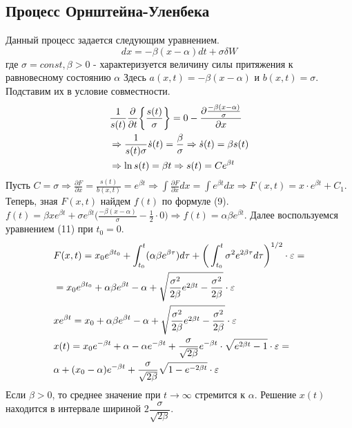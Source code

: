 \documentclass[12pt]{article}
\theoremstyle{definition}
\begin{document}
\subsection{Процесс Орнштейна-Уленбека}
Данный процесс задается следующим уравнением.
\begin{equation}
dx=-\beta(x-\alpha) dt +\sigma\delta W
\end{equation}
где $\sigma=const,\beta>0$ - характеризуется величину силы притяжения к равновесному состоянию $\alpha$
Здесь $a(x,t)=-\beta(x-\alpha)$ и $b(x,t)=\sigma$. Подставим их в условие совместности.
\begin{align}
  &\frac{1}{s(t)}\frac{\partial}{\partial t}\bigg\{ \frac{s(t)}{\sigma} \bigg\}=\notag
  0-\frac{\partial \frac{-\beta(x-\alpha)}{\sigma}}{\partial x}\\
  &\Rightarrow \frac{1}{s(t)\sigma}\dot{s}(t)=\frac{\beta}{\sigma} \Rightarrow \dot{s}(t)=\beta s(t)\\
  &\Rightarrow \ln{s(t)}=\beta t\Rightarrow s(t)=C e^{\beta t}\notag
\end{align}
Пусть $\displaystyle C=\sigma\Rightarrow \frac{\partial F}{\partial x}=\frac{s(t)}{b(x,t)}=e^{\beta t}\Rightarrow
\int \frac{\partial F}{\partial x}dx=\int e^{\beta t} dx\Rightarrow F(x,t)=x\cdot e^{\beta t}+C_1$.
Теперь, зная $F(x,t)$ найдем $f(t)$ по формуле (9).
$\displaystyle f(t)=\beta x e^{\beta t}+\sigma e^{\beta t}\bigg(\frac{-\beta(x-\alpha)}{\sigma}-\frac{1}{2}\cdot 0\bigg)\Rightarrow
 f(t)=\alpha\beta e^{\beta t}$.
 Далее воспользуемся уравнением (11) при $t_0=0$.
 \begin{align}
   &F(x,t)=x_0e^{\beta t_0}+\int_{t_0}^t (\alpha\beta e^{\beta \tau})d\tau+\bigg(\int_{t_0}^t \sigma^2e^{2\beta \tau}d\tau\bigg)^{1/2}\cdot\varepsilon=\notag\\
   &=x_0e^{\beta t_0}+\alpha\beta e^{\beta t}-\alpha+\sqrt{\frac{\sigma^2}{2\beta}e^{2\beta t}-\frac{\sigma^2}{2\beta}}\cdot\varepsilon\notag\\
   & xe^{\beta t}=x_0+\alpha\beta e^{\beta t}-\alpha+\sqrt{\frac{\sigma^2}{2\beta}e^{2\beta t}-\frac{\sigma^2}{2\beta}}\cdot\varepsilon\\
   & x(t)=x_0 e^{-\beta t}+\alpha-\alpha e^{-\beta t}+\frac{\sigma}{\sqrt{2\beta}}e^{-\beta t}\cdot \sqrt{e^{2\beta t}-1}\cdot\varepsilon=\notag\\
   &\alpha+(x_0-\alpha)e^{-\beta t}+\frac{\sigma}{\sqrt{2 \beta}}\sqrt{1-e^{-2\beta t}}\cdot\varepsilon\notag
 \end{align}
 Если $\beta>0$, то среднее значение при $t\to\infty$ стремится к $\alpha$. Решение $x(t)$ находится в интервале шириной $2\dfrac{\sigma}{\sqrt{2\beta}}$. 
\end{document}
